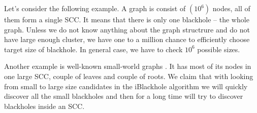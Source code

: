 \documentclass{svproc}
\begin{document}
Let's consider the following example. A graph is consist of $(10^6)$ nodes, all of them form a single SCC. It means that there is only one blackhole -- the whole graph.
Unless we do not know anything about the graph structrure and do not have large enough cluster, we have one to a million chance
to efficiently choose target size of blackhole. In general case, we have to check $10^6$ possible sizes.

Another example is well-known small-world graphs \cite{watts1999networks}. It has most of its nodes in one large SCC, couple of leaves and couple of roots.
We claim that with looking from small to large size candidates in the iBlackhole algorithm we will quickly discover all the small blackholes and then for a long time will try to discover blackholes inside an SCC.

\begin{figure}[H]
	\begin{center}
		\begin{algorithm}[H]
			\SetAlgoLined


\end{algorithm}
\end{center}
\end{figure}
\end{document}
